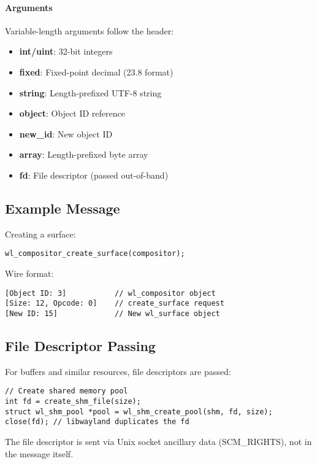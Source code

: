 \paragraph{Arguments}
Variable-length arguments follow the header:
\begin{itemize}
    \item \textbf{int/uint}: 32-bit integers
    \item \textbf{fixed}: Fixed-point decimal (23.8 format)
    \item \textbf{string}: Length-prefixed UTF-8 string
    \item \textbf{object}: Object ID reference
    \item \textbf{new\_id}: New object ID
    \item \textbf{array}: Length-prefixed byte array
    \item \textbf{fd}: File descriptor (passed out-of-band)
\end{itemize}

\subsection{Example Message}

Creating a surface:
\begin{lstlisting}[style=cstyle, caption=Creating a Surface]
wl_compositor_create_surface(compositor);
\end{lstlisting}

Wire format:
\begin{verbatim}
[Object ID: 3]           // wl_compositor object
[Size: 12, Opcode: 0]    // create_surface request
[New ID: 15]             // New wl_surface object
\end{verbatim}

\subsection{File Descriptor Passing}

For buffers and similar resources, file descriptors are passed:

\begin{lstlisting}[style=cstyle, caption=Passing File Descriptors]
// Create shared memory pool
int fd = create_shm_file(size);
struct wl_shm_pool *pool = wl_shm_create_pool(shm, fd, size);
close(fd); // libwayland duplicates the fd
\end{lstlisting}

The file descriptor is sent via Unix socket ancillary data (SCM\_RIGHTS), not in the message itself.

